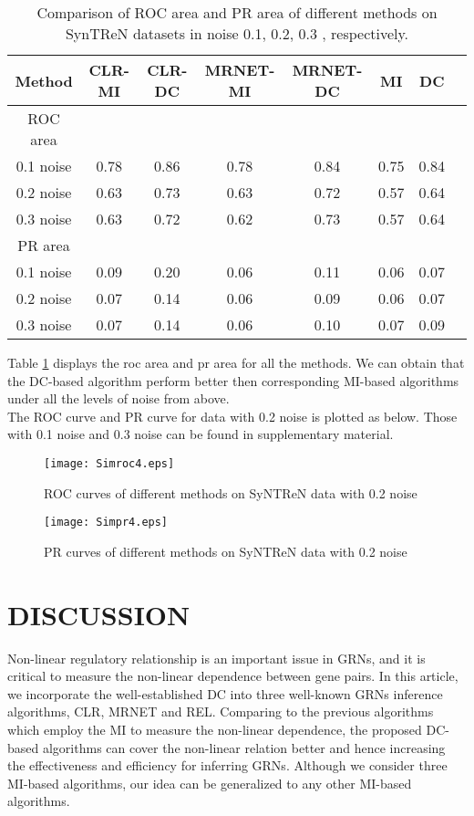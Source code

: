 \documentclass{bioinfo}
\begin{document}
\begin{table}[0.5\textwidth] \tiny
\centering \caption{Comparison of ROC area and PR area of different
methods on SynTReN datasets in noise 0.1, 0.2, 0.3 ,
respectively.}\label{noisy-roc-pr}
\begin{tabular}{cccccccc}
 \hline
 Method & CLR-MI & CLR-DC & MRNET-MI & MRNET-DC & MI & DC \\
 \hline
  ROC area\\
 0.1 noise & 0.78 & 0.86 & 0.78 & 0.84 & 0.75 & 0.84  \\
 0.2 noise & 0.63 & 0.73 & 0.63 & 0.72 & 0.57 & 0.64 \\
 0.3 noise & 0.63 & 0.72 & 0.62 & 0.73 & 0.57 & 0.64 \\
 PR area\\
 0.1 noise & 0.09 & 0.20 & 0.06 & 0.11 & 0.06 & 0.07  \\
 0.2 noise & 0.07 & 0.14 & 0.06 & 0.09 & 0.06 & 0.07  \\
 0.3 noise & 0.07 & 0.14 & 0.06 & 0.10 & 0.07 & 0.09 \\
  \hline
\end{tabular}
\end{table}

 Table \ref{noisy-roc-pr} displays the roc area and pr area for all
 the methods. We can obtain that the DC-based algorithm perform
 better then corresponding MI-based algorithms under all the levels
 of noise from above.\\
 The ROC curve and PR curve for data with 0.2 noise is plotted as
 below. Those with 0.1 noise and 0.3 noise can be found in
 supplementary material.
 \begin{figure}[!h]
  \texttt{[image: Simroc4.eps]}
  \caption{ROC curves of different methods on SyNTReN data with 0.2 noise}\label{noisy-roc-sos}
\end{figure}

\begin{figure}[!h]
  \texttt{[image: Simpr4.eps]}
  \caption{PR curves of different methods on SyNTReN data with 0.2 noise}\label{noisy-pr-sos}
\end{figure}



\section{DISCUSSION}

Non-linear regulatory relationship is an important issue in GRNs, and it is critical to measure the non-linear dependence between gene pairs. In this article,
we incorporate the well-established DC into three well-known GRNs inference algorithms, CLR, MRNET and REL. Comparing to the previous algorithms which employ the MI to measure the non-linear dependence, the proposed DC-based algorithms can cover the non-linear relation better and hence increasing the effectiveness and efficiency for inferring GRNs. Although we consider three MI-based algorithms, our idea can be generalized to any other MI-based algorithms.
\end{document}
